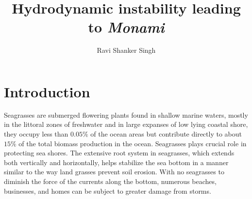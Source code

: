 \documentclass[12pt]{report}   %
\title{
Hydrodynamic instability leading to \textit{Monami}
}
\author{Ravi Shanker Singh}
\begin{document}
\doublespacing
\begin{preliminaries}
\maketitle

\copyrightpage

\begin{signature}
\end{signature}

\begin{vita}
\end{vita}

\begin{acknowledgments}
\end{acknowledgments}

\begin{abstract}
  \thispagestyle{empty}
\end{abstract}

\begin{spacing}{1}
  \tableofcontents
  \clearpage{\pagestyle{empty}\cleardoublepage}

  \footnotesize
  \fontsize{11.5pt}{12.5pt}\selectfont
  \listoftables
  \clearpage{\pagestyle{empty}\cleardoublepage}

  \listoffigures
  \clearpage{\pagestyle{empty}\cleardoublepage}
  \normalsize
\end{spacing}

\end{preliminaries}

\pagestyle{myheadings}


\chapter{Introduction}
Seagrasses are submerged flowering plants found in shallow marine waters, mostly in the littoral zones of freshwater and in large expanses of low lying coastal shore, they occupy less than $0.05\%$ of the ocean areas but contribute directly to about $15\%$ of the total biomass production in the ocean. Seagrasses plays crucial role in protecting sea shores. The extensive root system in seagrasses, which extends both vertically and horizontally, helps stabilize the sea bottom in a manner similar to the way land grasses prevent soil erosion. With no seagrasses to diminish the force of the currents along the bottom, numerous beaches, businesses, and homes can be subject to greater damage from storms.
\end{document}
